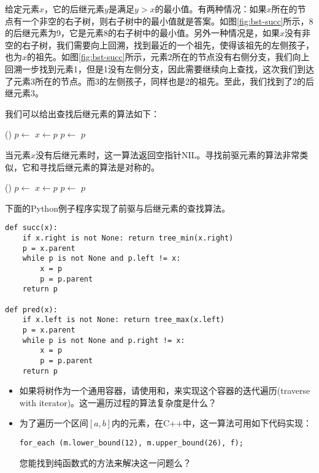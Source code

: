 \documentclass{ctexart}
\begin{document}
给定元素$x$，它的后继元素$y$是满足$y>x$的最小值。有两种情况：如果$x$所在的节点有一个非空的右子树，则右子树中的最小值就是答案。如图\ref{fig:bst-succ}所示，8的后继元素为9，它是元素8的右子树中的最小值。另外一种情况是，如果$x$没有非空的右子树，我们需要向上回溯，找到最近的一个祖先，使得该祖先的左侧孩子，也为$x$的祖先。如图\ref{fig:bst-succ}所示，元素2所在的节点没有右侧分支，我们向上回溯一步找到元素1，但是1没有左侧分支，因此需要继续向上查找，这次我们到达了元素3所在的节点。而3的左侧孩子，同样也是2的祖先。至此，我们找到了2的后继元素3。

我们可以给出查找后继元素的算法如下：

\begin{algorithmic}[1]
    \State \Return {}()
  \Else
    \State $p \gets $ 
      \State $x \gets p$
      \State $p \gets $ 
    \EndWhile
    \State \Return $p$
  \EndIf
\EndFunction
\end{algorithmic}

当元素$x$没有后继元素时，这一算法返回空指针NIL。寻找前驱元素的算法非常类似，它和寻找后继元素的算法是对称的。

\begin{algorithmic}[1]
    \State \Return {}()
  \Else
    \State $p \gets $ 
      \State $x \gets p$
      \State $p \gets $ 
    \EndWhile
    \State \Return $p$
  \EndIf
\EndFunction
\end{algorithmic}

下面的Python例子程序实现了前驱与后继元素的查找算法。

\lstset{language=Python}
\begin{lstlisting}
def succ(x):
    if x.right is not None: return tree_min(x.right)
    p = x.parent
    while p is not None and p.left != x:
        x = p
        p = p.parent
    return p

def pred(x):
    if x.left is not None: return tree_max(x.left)
    p = x.parent
    while p is not None and p.right != x:
        x = p
        p = p.parent
    return p
\end{lstlisting}

\begin{Exercise}

\begin{itemize}
\item 如果将树作为一个通用容器，请使用和，来实现这个容器的迭代遍历(traverse with iterator)。这一遍历过程的算法复杂度是什么？

\item 为了遍历一个区间$[a, b]$内的元素，在C++中，这一算法可用如下代码实现：

\texttt{for\_each (m.lower\_bound(12), m.upper\_bound(26), f);}

您能找到纯函数式的方法来解决这一问题么？
\end{itemize}

\end{Exercise}
\end{document}
